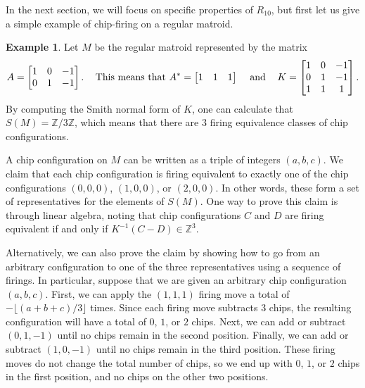 \documentclass[12p]{amsart}
\numberwithin{equation}{section}
\theoremstyle{plain}
\theoremstyle{definition}
\newtheorem{example}[thm]{Example}
\newcommand{\Z}{\mathbb {Z}}
\begin{document}
In the next section, we will focus on specific properties of $R_{10}$, but first let us give a simple example of chip-firing on a regular matroid.  

\begin{example}
    Let $M$ be the regular matroid represented by the matrix 
    \[A = \begin{bmatrix} 1 & 0 & -1 \\ 0 & 1 & -1\end{bmatrix}.\hspace{ .3 cm} \text{ This means that } A^* = \begin{bmatrix} 1 & 1 & 1\end{bmatrix}\hspace{ .3 cm} \text{ and } \hspace{ .3 cm} K = \begin{bmatrix} 1 & 0 & -1 \\ 0 & 1 & -1 \\ 1 & 1 & 1\end{bmatrix}.\]
    By computing the Smith normal form of $K$, one can calculate that $S(M) = \Z/3\Z$, which means that there are 3 firing equivalence classes of chip configurations. 
    
    A chip configuration on $M$ can be written as a triple of integers $(a,b,c)$. We claim that each chip configuration is firing equivalent to exactly one of the chip configurations $(0,0,0)$, $(1,0,0)$, or $(2,0,0)$. In other words, these form a set of representatives for the elements of $S(M)$. One way to prove this claim is through linear algebra, noting that chip configurations $C$ and $D$ are firing equivalent if and only if $K^{-1}(C-D) \in \Z^3$. 

    Alternatively, we can also prove the claim by showing how to go from an arbitrary configuration to one of the three representatives using a sequence of firings. In particular, suppose that we are given an arbitrary chip configuration $(a,b,c)$. First, we can apply the $(1,1,1)$ firing move a total of $-\lfloor(a+b+c)/3\rfloor$ times. Since each firing move subtracts 3 chips, the resulting configuration will have a total of $0$, $1$, or $2$ chips. Next, we can add or subtract $(0,1,-1)$ until no chips remain in the second position. Finally, we can add or subtract $(1,0,-1)$ until no chips remain in the third position. These firing moves do not change the total number of chips, so we end up with $0$, $1$, or $2$ chips in the first position, and no chips on the other two positions. 
\end{example}
\end{document}
